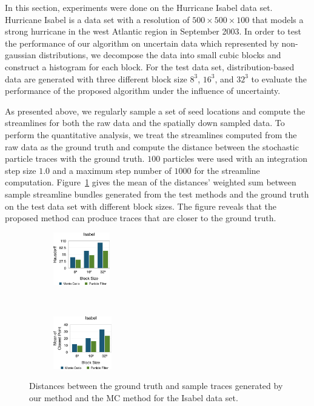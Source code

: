 In this section, experiments were done on the Hurricane Isabel data set. Hurricane Isabel is a data set with a resolution of $500 \times 500 \times 100$ that models a strong hurricane in the west Atlantic region in September 2003. In order to test the performance of our algorithm on uncertain data which represented by non-gaussian distributions, we decompose the data into small cubic blocks and construct a histogram for each block. For the test data set, distribution-based data are generated with three different block size $8^3$, $16^3$, and $32^3$ to evaluate the performance of the proposed algorithm under the influence of uncertainty.

As presented above, we regularly sample a set of seed locations and compute the streamlines for both the raw data and the spatially down sampled data. To perform the quantitative analysis, we treat the streamlines computed from the raw data as the ground truth and compute the distance between the stochastic particle traces with the ground truth. $100$ particles were used with an integration step size $1.0$ and a maximum step number of $1000$ for the streamline computation. Figure~\ref{berror_r} gives the mean of the distances' weighted sum between sample streamline bundles generated from the test methods and the ground truth on the test data set with different block sizes. The figure reveals that the proposed method can produce traces that are closer to the ground truth.

\begin{figure}[!htb]
  \centering
  \begin{subfigure}[b]{0.24\textwidth}
    \centering
    \includegraphics[height=0.9in]{../figures/isabel_h.eps}
  \end{subfigure}~
  \begin{subfigure}[b]{0.24\textwidth}
    \centering
    \includegraphics[height=0.9in]{../figures/isabel_m.eps}
  \end{subfigure}
  \caption{Distances between the ground truth and sample traces generated by our method and the MC method for the Isabel data set.}
  \label{berror_r}
\end{figure}

